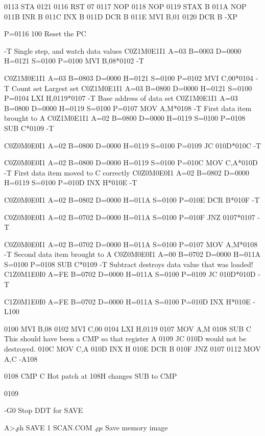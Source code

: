 0113   STA        0121
 0116   RST        07
 0117   NOP
 0118   NOP
 0119   STAX       B
 011A   NOP  
 011B   INR        B
 011C   INX        B
 011D   DCR        B
 011E   MVI        B,01
 0120   DCR        B
-XP

P=0116 100   Reset the PC

-T
    Single step, and watch data values
C0Z1M0E1I1 A=03 B=0003 D=0000 H=0121 S=0100 P=0100 MVI B,08*0102
-T

C0Z1M0E1I1 A=03 B=0803 D=0000 H=0121 S=0100 P=0102 MVI C,00*0104
-T
         Count set     Largest set
C0Z1M0E1I1 A=03 B=0800 D=0000 H=0121 S=0100 P=0104 LXI H,0119*0107
-T
                                    Base address of data set
C0Z1M0E1I1 A=03 B=0800 D=0000 H=0119 S=0100 P=0107 MOV A,M*0108
-T
                 First data item brought to A
C0Z1M0E1I1 A=02 B=0800 D=0000 H=0119 S=0100 P=0108 SUB C*0109
-T

C0Z0M0E0I1 A=02 B=0800 D=0000 H=0119 S=0100 P=0109 JC 010D*010C
-T

C0Z0M0E0I1 A=02 B=0800 D=0000 H=0119 S=0100 P=010C MOV C,A*010D
-T
                       First data item moved to C correctly
C0Z0M0E0I1 A=02 B=0802 D=0000 H=0119 S=0100 P=010D INX H*010E
-T

C0Z0M0E0I1 A=02 B=0802 D=0000 H=011A S=0100 P=010E DCR B*010F
-T

C0Z0M0E0I1 A=02 B=0702 D=0000 H=011A S=0100 P=010F JNZ 0107*0107
-T

C0Z0M0E0I1 A=02 B=0702 D=0000 H=011A S=0100 P=0107 MOV A,M*0108
-T
                 Second data item brought to A
C0Z0M0E0I1 A=00 B=0702 D=0000 H=011A S=0100 P=0108 SUB C*0109
-T
                 Subtract destroys data value that was loaded!
C1Z0M1E0I0 A=FE B=0702 D=0000 H=011A S=0100 P=0109 JC 010D*010D
-T

C1Z0M1E0I0 A=FE B=0702 D=0000 H=011A S=0100 P=010D INX H*010E
-L100

 0100   MVI        B,08
 0102   MVI        C,00
 0104   LXI        H,0119
 0107   MOV        A,M
 0108   SUB        C       This should have been a CMP so that register A
 0109   JC         010D    would not be destroyed.
 010C   MOV        C,A
 010D   INX        H
 010E   DCR        B
 010F   JNZ        0107
 0112   MOV        A,C
 -A108

0108 CMP C    Hot patch at 108H changes SUB to CMP

0109

-G0   Stop DDT for SAVE

A>\c
.sh
SAVE 1 SCAN.COM    \c
.qs
Save memory image

